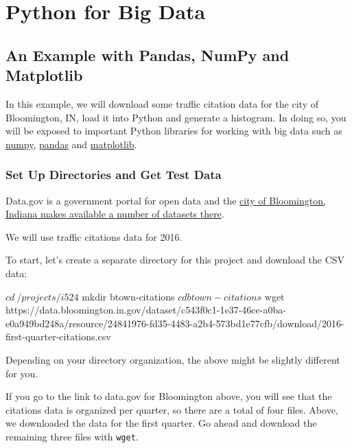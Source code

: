 \section{Python for Big Data}\label{python-for-big-data}

\subsection{An Example with Pandas, NumPy and Matplotlib}\label{an-example-with-pandas-numpy-and-matplotlib}

In this example, we will download some traffic citation data for the
city of Bloomington, IN, load it into Python and generate a histogram.
In doing so, you will be exposed to important Python libraries for
working with big data such as \href{www.numpy.org}{numpy},
\href{pandas.pydata.org}{pandas} and \href{matplotlib.org}{matplotlib}.

\subsubsection{Set Up Directories and Get Test
Data}\label{set-up-directories-and-get-test-data}

Data.gov is a government portal for open data and the
\href{https://catalog.data.gov/dataset?organization_type=City+Government\&organization=city-of-bloomington\&_organization_limit=0}{city
of Bloomington, Indiana makes available a number of datasets there}.

We will use traffic citations data for 2016.

To start, let's create a separate directory for this project and
download the CSV data:

\begin{lstlistings}
$ cd ~/projects/i524
$ mkdir btown-citations
$ cd btown-citations
$ wget https://data.bloomington.in.gov/dataset/c543f0c1-1e37-46ce-a0ba-e0a949bd248a/resource/24841976-fd35-4483-a2b4-573bd1e77cfb/download/2016-first-quarter-citations.csv
\end{lstlistings}

Depending on your directory organization, the above might be slightly
different for you.

If you go to the link to data.gov for Bloomington above, you will see
that the citations data is organized per quarter, so there are a total
of four files. Above, we downloaded the data for the first quarter. Go
ahead and download the remaining three files with \texttt{wget}.

